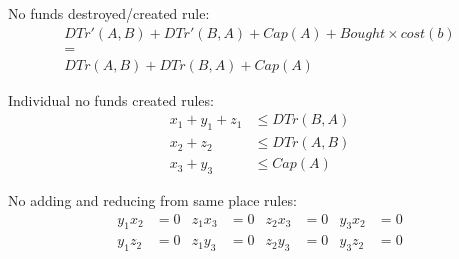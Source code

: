 No funds destroyed/created rule:
\begin{gather*}
  DTr'(A,B) + DTr'(B,A) + Cap(A) + Bought \times cost(b) \\ = \\
  DTr(A,B) + DTr(B,A) + Cap(A)
\end{gather*}

Individual no funds created rules:
\begin{align*}
  x_1 + y_1 + z_1 & \leq DTr(B,A) \\
  x_2 + z_2 & \leq DTr(A,B) \\
  x_3 + y_3 & \leq Cap(A)
\end{align*}

No adding and reducing from same place rules:
\begin{align*}
  y_1x_2 &= 0 & z_1x_3 &= 0 & z_2x_3 &= 0 & y_3x_2 &= 0 \\
  y_1z_2 &= 0 & z_1y_3 &= 0 & z_2y_3 &= 0 & y_3z_2 &= 0
\end{align*}
